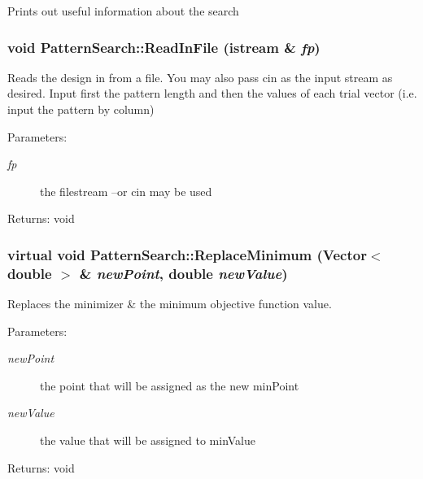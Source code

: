 Prints out useful information about the search 
\subsubsection{\setlength{\rightskip}{0pt plus 5cm}void Pattern\-Search::Read\-In\-File (istream \& {\em fp})}\label{classPatternSearch_z17_4}


Reads the design in from a file. You may also pass cin as the input stream as desired. Input first the pattern length and then the values of each trial vector (i.e. input the pattern by column) \begin{Desc}
\item[Parameters:]
\begin{description}
\item[{\em fp}]the filestream --or cin may be used \end{description}
\end{Desc}
\begin{Desc}
\item[Returns:]void \end{Desc}
\subsubsection{\setlength{\rightskip}{0pt plus 5cm}virtual void Pattern\-Search::Replace\-Minimum (Vector$<$ double $>$ \& {\em new\-Point}, double {\em new\-Value})\hspace{0.3cm}{\tt  [protected, virtual]}}\label{classPatternSearch_b4}


Replaces the minimizer \& the minimum objective function value. \begin{Desc}
\item[Parameters:]
\begin{description}
\item[{\em new\-Point}]the point that will be assigned as the new min\-Point \item[{\em new\-Value}]the value that will be assigned to min\-Value \end{description}
\end{Desc}
\begin{Desc}
\item[Returns:]void \end{Desc}

